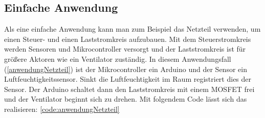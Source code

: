 \subsection{Einfache Anwendung}
Als eine einfache Anwendung kann man zum Beispiel das Netzteil verwenden, um einen Steuer- und einen Laststromkreis aufzubauen. Mit dem Steuerstromkreis werden Sensoren und Mikrocontroller versorgt und der Laststromkreis ist für größere Aktoren wie ein Ventilator zuständig. In diesem Anwendungsfall (\ref{anwendungNetzteil}) ist der Mikrocontroller ein Arduino und der Sensor ein Luftfeuchtigkeitssensor. Sinkt die Luftfeuchtigkeit im Raum registriert dies der Sensor. Der Arduino schaltet dann den Laststromkreis mit einem MOSFET frei und der Ventilator beginnt sich zu drehen. Mit folgendem Code lässt sich das realisieren: \ref{code:anwendungNetzteil} 

